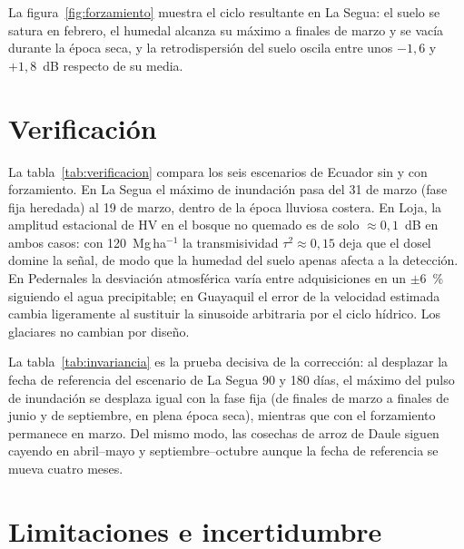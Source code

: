 \documentclass[11pt,a4paper]{article}
\begin{document}
La figura~\ref{fig:forzamiento} muestra el ciclo resultante en La Segua: el suelo se satura en febrero,
el humedal alcanza su máximo a finales de marzo y se vacía durante la época seca, y la retrodispersión
del suelo oscila entre unos $-1{,}6$ y $+1{,}8$~dB respecto de su media.

\FiguraForzamiento

\section{Verificación}

La tabla~\ref{tab:verificacion} compara los seis escenarios de Ecuador sin y con forzamiento. En La
Segua el máximo de inundación pasa del 31 de marzo (fase fija heredada) al 19 de marzo, dentro de la
época lluviosa costera. En Loja, la amplitud estacional de HV en el bosque no quemado es de solo
$\approx0{,}1$~dB en ambos casos: con 120~Mg\,ha$^{-1}$ la transmisividad $\tau^2\approx 0{,}15$ deja que el
dosel domine la señal, de modo que la humedad del suelo apenas afecta a la detección. En Pedernales la
desviación atmosférica varía entre adquisiciones en un $\pm6$~\% siguiendo el agua precipitable; en
Guayaquil el error de la velocidad estimada cambia ligeramente al sustituir la sinusoide arbitraria por
el ciclo hídrico. Los glaciares no cambian por diseño.

\TablaVerificacion

La tabla~\ref{tab:invariancia} es la prueba decisiva de la corrección: al desplazar la fecha de referencia
del escenario de La Segua 90 y 180 días, el máximo del pulso de inundación se desplaza igual con la fase
fija (de finales de marzo a finales de junio y de septiembre, en plena época seca), mientras que con el
forzamiento permanece en marzo. Del mismo modo, las cosechas de arroz de Daule siguen cayendo en
abril--mayo y septiembre--octubre aunque la fecha de referencia se mueva cuatro meses.

\TablaInvariancia

\section{Limitaciones e incertidumbre}
\end{document}
